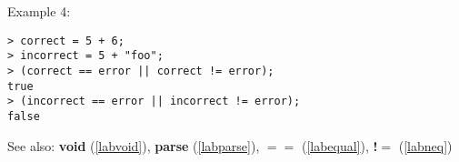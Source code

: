 \noindent Example 4: 
\begin{center}\begin{minipage}{15cm}\begin{Verbatim}[frame=single]
> correct = 5 + 6;
> incorrect = 5 + "foo";
> (correct == error || correct != error);
true
> (incorrect == error || incorrect != error);
false
\end{Verbatim}
\end{minipage}\end{center}
See also: \textbf{void} (\ref{labvoid}), \textbf{parse} (\ref{labparse}), \textbf{$==$} (\ref{labequal}), \textbf{!$=$} (\ref{labneq})
